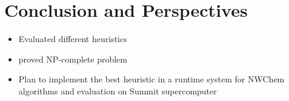 \documentclass[runningheads]{llncs} %
\begin{document}
	\section{Conclusion and Perspectives}
	\begin{itemize}
		\item Evaluated different heuristics
		\item proved NP-complete problem
		\item Plan to implement the best heuristic in a runtime system  for NWChem algorithms and evaluation on Summit supercomputer
	\end{itemize}
\end{document}
